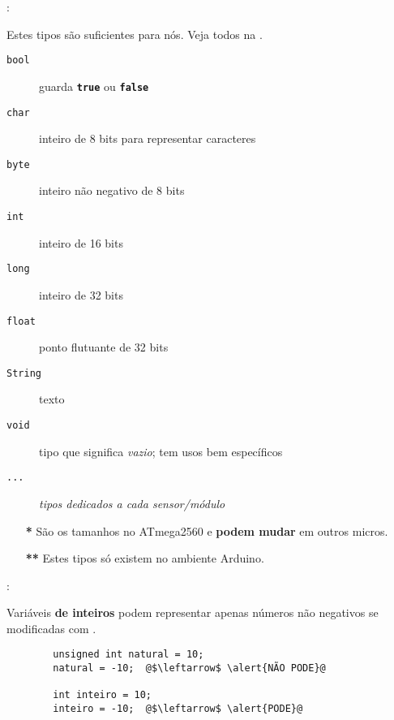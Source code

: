 \begin{frame}{\insertsection: \insertsubsection}

	Estes tipos são suficientes para nós. Veja todos na .

	\begin{description}
		\item[\texttt{bool}] guarda \textbf{\texttt{true}} ou \textbf{\texttt{false}}%
		\item[\texttt{char}] inteiro de 8 bits para representar caracteres
		\item[\texttt{byte}] inteiro não negativo de 8 bits\Highlight{**}
		\item[\texttt{int}] inteiro de 16 bits\Highlight{*}
		\item[\texttt{long}] inteiro de 32 bits\Highlight{*}
		\item[\texttt{float}] ponto flutuante de 32 bits
		\item[\texttt{String}] texto\Highlight{**}
		\item[\texttt{void}] tipo que significa \emph{vazio}; tem usos bem específicos
		\item[\texttt{...}] \emph{tipos dedicados a cada sensor/módulo}
	\end{description}

	\vfill
	\begin{itemize}
		\item[\textbf{*}] São os tamanhos no ATmega2560 e \textbf{podem mudar} em outros micros.
		\item[\textbf{**}] Estes tipos só existem no ambiente Arduino.
	\end{itemize}

\end{frame}


\begin{frame}[fragile]{\insertsection: \insertsubsection}

	Variáveis \textbf{de inteiros} podem representar apenas números não negativos se modificadas com \texttt{}.
	\begin{verbatim}
		unsigned int natural = 10;
		natural = -10;  @$\leftarrow$ \alert{NÃO PODE}@

		int inteiro = 10;
		inteiro = -10;  @$\leftarrow$ \alert{PODE}@
	\end{verbatim}

\end{frame}


